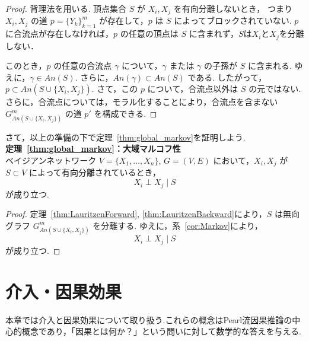 \documentclass[uplatex, dvipdfmx]{jsarticle}
\begin{document}
\begin{proof}
  背理法を用いる.
  頂点集合 $S$ が $X_i, X_j$ を有向分離しないとき，
  つまり $X_i, X_j$ の道 $p = \{Y_k\}_{k=1}^m$ が存在して，$p$ は $S$ によってブロックされていない.
  $p$に合流点が存在しなければ，$p$ の任意の頂点は $S$ に含まれず，$S$は$X_i$と$X_j$を分離しない．

  このとき，$p$ の任意の合流点 $\gamma$ について，$\gamma$ または $\gamma$ の子孫が $S$ に含まれる.
  ゆえに，$\gamma \in An(S)$.
  さらに，$An(\gamma) \subset An(S)$ である.
  したがって，$p \subset An(S \cup \{X_i, X_j\})$.
  さて，この $p$ について，合流点以外は $S$ の元ではない.
  さらに，合流点については，モラル化することにより，合流点を含まない $G^m_{An(S \cup \{X_i, X_j\})}$ の道 $p'$ を構成できる.
\end{proof}

さて，以上の準備の下で定理~\ref{thm:global_markov}を証明しよう.\\
\textbf{定理~\ref{thm:global_markov}：大域マルコフ性}\\
ベイジアンネットワーク $V = \{X_1, \dots, X_n\}$, $G = (V, E)$ において，$X_i, X_j$ が $S \subset V$ によって有向分離されているとき，
\begin{equation}
    X_i \perp X_j \mid S
\end{equation}
が成り立つ.

\begin{proof}
  定理~\ref{thm:LauritzenForward}, \ref{thm:LauritzenBackward}により，$S$ は無向グラフ $G^m_{An(S \cup \{X_i, X_j\})}$ を分離する.
  ゆえに，系~\ref{cor:Markov}により，
  \begin{equation}
      X_i \perp X_j \mid S
  \end{equation}
  が成り立つ.
\end{proof}

\newpage

\section{介入・因果効果}
本章では介入と因果効果について取り扱う.これらの概念はPearl流因果推論の中心的概念であり，「因果とは何か？」という問いに対して数学的な答えを与える.
\end{document}
